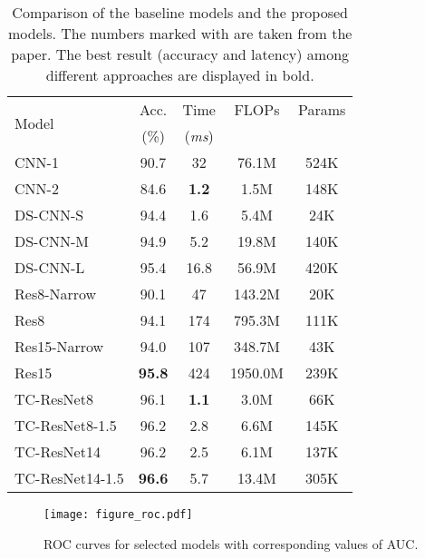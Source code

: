 \documentclass[a4paper]{article}
\begin{document}
\begin{table}[t]
    \begin{tabular}{lcccc}
        \toprule
        \multirow{2}{*}{Model} & Acc. & Time & FLOPs & Params \\
                              & (\%) & (\emph{ms})     &       & \\
        \midrule
        CNN-1                   & 90.7 & 32  & 76.1M  & 524K \\
        CNN-2                   & 84.6 & \textbf{1.2}  & 1.5M  & 148K \\
        DS-CNN-S                & 94.4 & 1.6   & 5.4M  & 24K \\
        DS-CNN-M                & 94.9 & 5.2   & 19.8M & 140K \\
        DS-CNN-L                & 95.4 & 16.8  & 56.9M & 420K \\        
        Res8-Narrow             & 90.1 & 47    & 143.2M  & 20K \\
        Res8                    & 94.1 & 174   & 795.3M  & 111K \\
        Res15-Narrow            & 94.0 & 107   & 348.7M  & 43K \\
        Res15                   & \textbf{95.8} & 424   & 1950.0M  & 239K \\
        \midrule
        TC-ResNet8                   & 96.1 & \textbf{1.1}   & 3.0M  & 66K \\
        TC-ResNet8-1.5               & 96.2 & 2.8   & 6.6M  & 145K \\
        TC-ResNet14                  & 96.2 & 2.5   & 6.1M  & 137K \\
        TC-ResNet14-1.5              & \textbf{96.6} & 5.7   & 13.4M & 305K \\
        \bottomrule
    \end{tabular}
    \caption{Comparison of the baseline models and the proposed models. 
    The numbers marked with  are taken from the paper.
    The best result (accuracy and latency) among different approaches are displayed in bold.
    }
    \vspace{-0.3cm}
    \label{tab:res}
\end{table}

\begin{figure}[t]
    \texttt{[image: figure\_roc.pdf]}
    \caption{ROC curves for selected models with corresponding values of AUC.}
    \vspace{-0.2cm}
    \label{fig:roc}
\end{figure}
\end{document}
